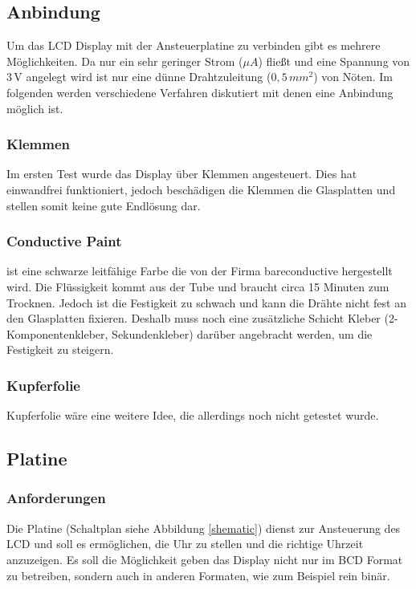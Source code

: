 \subsection{Anbindung}
Um das LCD Display mit der Ansteuerplatine zu verbinden gibt es mehrere Möglichkeiten. Da nur ein sehr geringer Strom (\(\mu A\)) fließt und eine Spannung von \(3\,\textrm{V}\) angelegt wird ist nur eine dünne Drahtzuleitung (\(0,5\, mm^2\)) von Nöten. Im folgenden werden verschiedene Verfahren diskutiert mit denen eine Anbindung möglich ist.

\subsubsection{Klemmen}
Im ersten Test wurde das Display über Klemmen angesteuert. Dies hat einwandfrei funktioniert, jedoch beschädigen die Klemmen die Glasplatten und stellen somit keine gute Endlösung dar.

\subsubsection{Conductive Paint}
\cite[\textit{Conductive Paint}]{conductivepaint} ist eine schwarze leitfähige Farbe die von der Firma bareconductive hergestellt wird. Die Flüssigkeit kommt aus der Tube und braucht circa 15 Minuten zum Trocknen. Jedoch ist die Festigkeit zu schwach und kann die Drähte nicht fest an den Glasplatten fixieren. Deshalb muss noch eine zusätzliche Schicht Kleber (2-Komponentenkleber, Sekundenkleber) darüber angebracht werden, um die Festigkeit zu steigern.

\subsubsection{Kupferfolie}
Kupferfolie wäre eine weitere Idee, die allerdings noch nicht getestet wurde.

\subsection{Platine}\label{subsec:platine}

\subsubsection{Anforderungen}
Die Platine (Schaltplan siehe Abbildung \ref{shematic}) dienst zur Ansteuerung des LCD und soll es ermöglichen, die Uhr zu stellen und die richtige Uhrzeit anzuzeigen. Es soll die Möglichkeit geben das Display nicht nur im BCD Format zu betreiben, sondern auch in anderen Formaten, wie zum Beispiel rein binär.

